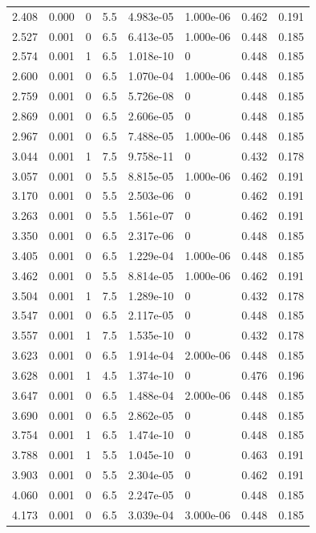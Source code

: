 \documentclass[preview]{standalone}
\begin{document}
{{\begin{tabular}{L{1.2cm}C{1.2cm} C{0.3cm}C{0.5cm} C{1.4cm}C{1.4cm} C{1.4cm}C{1.4cm}}
  2.408  &  0.000  & 0     & 5.5 &  4.983e-05  & 1.000e-06  & 0.462 &  0.191   \\ 
  2.527  &  0.001  & 0     & 6.5 &  6.413e-05  & 1.000e-06  & 0.448 &  0.185   \\ 
  2.574  &  0.001  & 1     & 6.5 &  1.018e-10  & 0  & 0.448 &  0.185   \\ 
  2.600  &  0.001  & 0     & 6.5 &  1.070e-04  & 1.000e-06  & 0.448 &  0.185   \\ 
  2.759  &  0.001  & 0     & 6.5 &  5.726e-08  & 0  & 0.448 &  0.185   \\ 
  2.869  &  0.001  & 0     & 6.5 &  2.606e-05  & 0  & 0.448 &  0.185   \\ 
  2.967  &  0.001  & 0     & 6.5 &  7.488e-05  & 1.000e-06  & 0.448 &  0.185   \\ 
  3.044  &  0.001  & 1     & 7.5 &  9.758e-11  & 0  & 0.432 &  0.178   \\ 
  3.057  &  0.001  & 0     & 5.5 &  8.815e-05  & 1.000e-06  & 0.462 &  0.191   \\ 
  3.170  &  0.001  & 0     & 5.5 &  2.503e-06  & 0  & 0.462 &  0.191   \\ 
  3.263  &  0.001  & 0     & 5.5 &  1.561e-07  & 0  & 0.462 &  0.191   \\ 
  3.350  &  0.001  & 0     & 6.5 &  2.317e-06  & 0  & 0.448 &  0.185   \\ 
  3.405  &  0.001  & 0     & 6.5 &  1.229e-04  & 1.000e-06  & 0.448 &  0.185   \\ 
  3.462  &  0.001  & 0     & 5.5 &  8.814e-05  & 1.000e-06  & 0.462 &  0.191   \\ 
  3.504  &  0.001  & 1     & 7.5 &  1.289e-10  & 0  & 0.432 &  0.178   \\ 
  3.547  &  0.001  & 0     & 6.5 &  2.117e-05  & 0  & 0.448 &  0.185   \\ 
  3.557  &  0.001  & 1     & 7.5 &  1.535e-10  & 0  & 0.432 &  0.178   \\ 
  3.623  &  0.001  & 0     & 6.5 &  1.914e-04  & 2.000e-06  & 0.448 &  0.185   \\ 
  3.628  &  0.001  & 1     & 4.5 &  1.374e-10  & 0  & 0.476 &  0.196   \\ 
  3.647  &  0.001  & 0     & 6.5 &  1.488e-04  & 2.000e-06  & 0.448 &  0.185   \\ 
  3.690  &  0.001  & 0     & 6.5 &  2.862e-05  & 0  & 0.448 &  0.185   \\ 
  3.754  &  0.001  & 1     & 6.5 &  1.474e-10  & 0  & 0.448 &  0.185   \\ 
  3.788  &  0.001  & 1     & 5.5 &  1.045e-10  & 0  & 0.463 &  0.191   \\ 
  3.903  &  0.001  & 0     & 5.5 &  2.304e-05  & 0  & 0.462 &  0.191   \\ 
  4.060  &  0.001  & 0     & 6.5 &  2.247e-05  & 0  & 0.448 &  0.185   \\ 
  4.173  &  0.001  & 0     & 6.5 &  3.039e-04  & 3.000e-06  & 0.448 &  0.185   \\ 
\hline 
\end{tabular} 

}}
\end{document}
